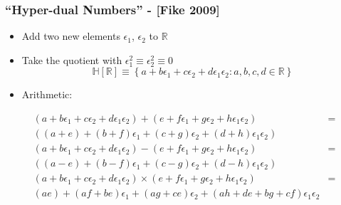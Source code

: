 \documentclass[mathserif]{beamer}
\newcommand{\Reals}{{\ensuremath{\mathbb{R}}}}
\newcommand{\Hyperduals}{{\ensuremath{\mathbb{H}}}}
\begin{document}
\begin{frame}
\frametitle{``Hyper-dual Numbers'' - [Fike 2009]}

\begin{itemize}
\item Add two new elements $\epsilon_1$, $\epsilon_2$ to $\Reals$
\item Take the quotient with $\epsilon_1^2 \equiv \epsilon_2^2 \equiv 0$
\[\Hyperduals[\Reals] \equiv \left\{a + b \epsilon_1 + c \epsilon_2 + d \epsilon_1 \epsilon_2: a,b,c,d \in \Reals\right\}\]
\item Arithmetic:
\end{itemize}
\begin{align*}
(a+b\epsilon_1+c\epsilon_2+d\epsilon_1 \epsilon_2) + 
  (e+f\epsilon_1+g\epsilon_2+h\epsilon_1 \epsilon_2) &= \\
  ((a+e) + (b+f)\epsilon_1 + (c+g)\epsilon_2 + (d+h)\epsilon_1 \epsilon_2) & \\
(a+b\epsilon_1+c\epsilon_2+d\epsilon_1 \epsilon_2) - 
  (e+f\epsilon_1+g\epsilon_2+h\epsilon_1 \epsilon_2) &= \\
  ((a-e) + (b-f)\epsilon_1 + (c-g)\epsilon_2 + (d-h)\epsilon_1 \epsilon_2) & \\
(a+b\epsilon_1+c\epsilon_2+d\epsilon_1 \epsilon_2) \times
  (e+f\epsilon_1+g\epsilon_2+h\epsilon_1 \epsilon_2) &= \\
(ae) + (af+be)\epsilon_1 + (ag+ce)\epsilon_2 + (ah+de+bg+cf)\epsilon_1\epsilon_2 & 
\end{align*}

\end{frame}
\end{document}
